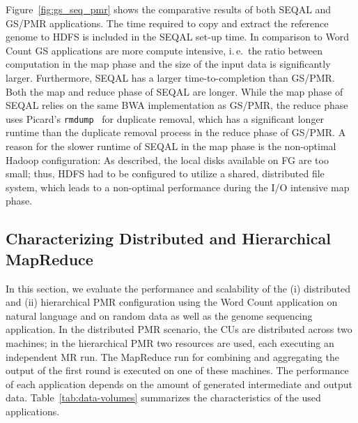 \documentclass{acm_proc_article-sp}
\newcommand{\jhanote}[1]{ {\textcolor{red} { ***SJ: #1 }}}
\newcommand{\alnote}[1]{ {\textcolor{blue} { ***andreL: #1 }}}
\newcommand{\pnote}[1]{ {\textcolor{magenta} { ***pradeep: #1 }}}
\newcommand{\alnote}[1]{}
\newcommand{\pnote}[1]{}
\newcommand{\jhanote}[1]{}
\newcommand{\upp}{\vspace*{-0.5em}}
\begin{document}
Figure~\ref{fig:gs_seq_pmr} shows the comparative results of both
SEQAL and GS/PMR applications. The time required to copy and extract
the reference genome to HDFS is included in the SEQAL set-up time. In
comparison to Word Count GS applications are more compute intensive,
i.\,e.\ the ratio between computation in the map phase and the size of
the input data is significantly larger. Furthermore, SEQAL has a larger
time-to-completion than GS/PMR. Both the map and reduce phase of SEQAL
are longer. While the map phase of SEQAL relies on the same BWA
implementation as GS/PMR, the reduce phase uses Picard's
\texttt{rmdump}~\cite{picard} for duplicate removal, which has a
significant longer runtime than the duplicate removal process in the
reduce phase of GS/PMR.
A reason for the slower runtime of SEQAL in the map phase is the non-optimal
Hadoop configuration: As described, the local disks available on FG are too
small; thus, HDFS had to be configured to utilize a shared, distributed file
system, which leads to a non-optimal performance during the I/O intensive map
phase.


\upp
\subsection{Characterizing Distributed and Hierarchical MapReduce}


In this section, we evaluate the performance and scalability of the (i)
distributed and (ii) hierarchical PMR configuration using the Word Count
application on natural language and on random data as well as the genome
sequencing application. In the distributed PMR scenario, the CUs are
distributed across two machines; in the hierarchical PMR two resources are used,
each executing an independent MR run. The MapReduce run for combining and
aggregating the output of the first round is executed on one of these machines.
The performance of each application depends on the amount of generated
intermediate and output data. Table~\ref{tab:data-volumes} summarizes the
characteristics of the used applications.
\end{document}
